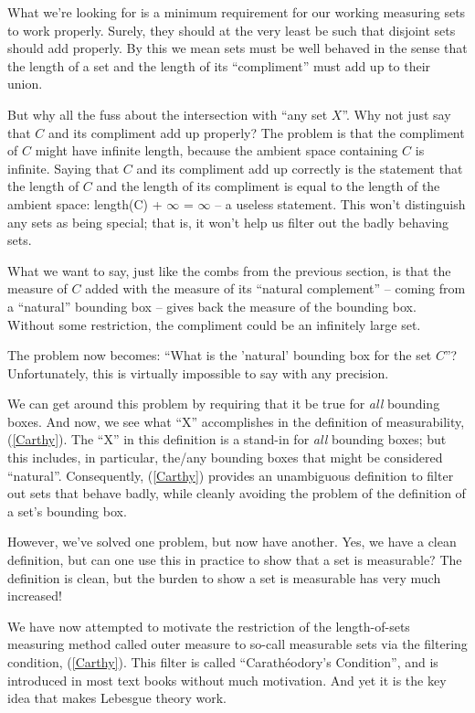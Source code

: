 \documentclass{article}
\begin{document}
What we're looking for is a minimum requirement for our working measuring sets 
to work properly. Surely, they should at the very least be such that disjoint sets
should add properly. 
By this we mean sets must be well behaved
in the sense that the length of a set and the length of its ``compliment'' 
must add up to their union. 

But why all the fuss about the intersection with ``any set $X$''.
Why not just say that $C$ and its compliment add up properly?
The problem is that the compliment of $C$ might have infinite length, because
the ambient space containing $C$ is infinite.
Saying that $C$ and its compliment add up correctly is the statement that 
the length of $C$ and the length of its compliment is equal to the length 
of the ambient space: length(C) + $\infty$ = $\infty$ -- a useless statement.
This won't distinguish any sets as being special; that is, it won't help
us filter out the badly behaving sets.

What we want to say, just like the combs from the
previous section, is that the measure of $C$ added with the measure of its 
``natural complement'' -- coming from a ``natural'' bounding box -- 
gives back the measure of the bounding box.
Without some restriction, the compliment could be 
an infinitely large set.

The problem now becomes: ``What is the 'natural' bounding box for the set $C$''?
Unfortunately, this is virtually impossible to say with any precision.

We can get around this problem by requiring that it be true for {\em all\/} 
bounding boxes. And now, we see what ``X'' accomplishes in the definition of 
measurability, (\ref{Carthy}). The ``X'' in this definition is a stand-in for 
{\em all\/} bounding boxes; but this includes, in particular, the/any 
bounding boxes that might be considered ``natural''. 
Consequently, (\ref{Carthy}) provides an unambiguous definition to filter out 
sets that behave badly, while cleanly avoiding 
the problem of the definition of a set's bounding box.

However, we've solved one problem, but now have another. Yes, we have 
a clean definition, but can one use this in practice to show that a 
set is measurable? The definition is clean, but the burden to show a set is
measurable has very much increased!

We have now attempted to motivate the restriction of the length-of-sets 
measuring method called outer measure to so-call measurable sets via 
the filtering condition, (\ref{Carthy}).
This filter is called ``Carath\'eodory's Condition'',
and is introduced in most text books without much motivation. 
And yet it is the key idea that makes Lebesgue theory work. 
 
\end{document}
